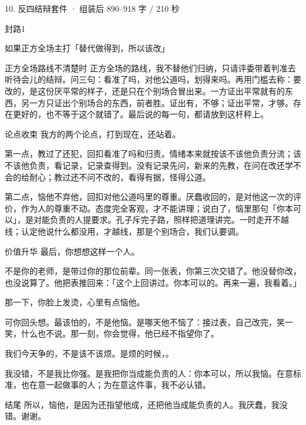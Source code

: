 \documentclass[script,con]{debate}
\begin{document}
\begin{kit}{10. 反四结辩}{套件 · 组装后 890–918 字 / 210 秒}
\begin{pick}{封路}{1}
\begin{module}{如果正方全场主打「替代做得到，所以该改」}
\end{module}
\begin{fallback}{正方全场路线不清楚时}
正方全场的路线，我不替他们归纳，只请评委带着判准去听待会儿的结辩。问三句：看准了吗，对他公道吗，划得来吗。再用门槛去称：要改的，是这份厌平常的样子，还是只在个别场合冒出来。一方证出平常就有的东西，另一方只证出个别场合的东西，前者胜。证出有，不够；证出平常，才够。存在更好的，也不等于这个就错了。最后说的每一句，都请放到这杆秤上。
\end{fallback}
\end{pick}
\begin{fixed}{论点收束}
我方的两个论点，打到现在，还站着。

第一点，教过了还犯，回扣看准了吗和归责。情绪本来就按该不该他负责分流；该不该他负责，看记录，记录查得到。没有记录先问，新来的先教，在问在改还学不会的给耐心；教过还不问不改的，看得有据，怪得公道。

第二点，恼他不弃他，回扣对他公道吗里的尊重。厌蠢收回的，是对他这一次的评价，作为人的尊重不动。态度完全客观，才不能讲理；说白了，恼里那句「你本可以」，是对能负责的人提要求。孔子斥完子路，照样把道理讲完。一时走开不越线；认定他说什么都没用，才越线，那是个别场合，我们认要调。
\end{fixed}
\begin{fixed}{价值升华}
最后，你想想这样一个人。

不是你的老师，是带过你的那位前辈。同一张表，你第三次交错了。他没替你改，也没说算了。他把表推回来：「这个上回讲过。你本可以的。再来一遍，我看着。」

那一下，你脸上发烫，心里有点恼他。

可你回头想。最该怕的，不是他恼。是哪天他不恼了：接过表，自己改完，笑一笑，什么也不说。那一刻，你会觉得，他已经不指望你了。

我们今天争的，不是该不该烦。是烦的时候，。

我没错，不是我比你强。是我把你当成能负责的人：你本可以，所以我恼。在意标准，也在意一起做事的人；为在意这件事，我不必认错。
\end{fixed}
\begin{fixed}{结尾}
所以，恼他，是因为还指望他成，还把他当成能负责的人。我厌蠢，我没错。谢谢。
\end{fixed}
\end{kit}
\begin{contingency}
\end{contingency}
\end{document}
